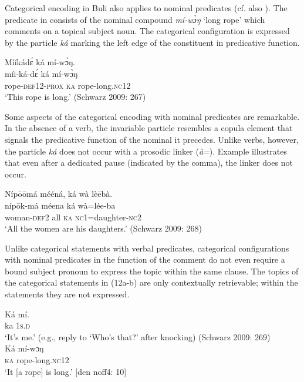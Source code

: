 \documentclass[output=paper]{langsci/langscibook}
\begin{document}
Categorical encoding in Buli also applies to nominal predicates (cf. also \citealt{Schwarz2009tonal}). The predicate in  consists of the nominal compound \textit{mí-w\`ɔŋ} ‘long rope’ which comments on a topical subject noun. The categorical configuration is expressed by the particle \textit{ká} marking the left edge of the constituent in predicative function. 

\ea\label{ex:schwarz:10}
\glll  Mííkád\'ɛ    ká  mí-w\`{ɔ}ŋ.\\
  míi-ká-d\'ɛ    ká  mí-w\`{ɔ}ŋ\\
       rope-\textsc{def}12-\textsc{prox}  \textsc{ka}  rope-long.\textsc{nc}12\\
\glt ‘This rope is long.’ (Schwarz 2009: 267)
\z

Some aspects of the categorical encoding with nominal predicates are remarkable. In the absence of a verb, the invariable particle resembles a copula element that signals the predicative function of the nominal it precedes. Unlike verbs, however, the particle \textit{ká} does not occur with a prosodic linker (\textit{à=}). Example  illustrates that even after a dedicated pause (indicated by the comma), the linker does not occur.

\ea\label{ex:schwarz:11}
\glll   \textup{Níp}\={o}\={o}má  mééná,    ká  {wà  lè\={e}bà.}\\
    níp\={o}k-má  méena    ká  wà=lée-ba\\
   woman-\textsc{def}2  all    \textsc{ka}  \textsc{nc}1=daughter-\textsc{nc}2\\
\glt ‘All the women are his daughters.’ (Schwarz 2009: 268)
\z

Unlike categorical statements with verbal predicates, categorical configurations with nominal predicates in the function of the comment do not even require a bound subject pronoun to express the topic within the same clause. The topics of the categorical statements in (12a-b) are only contextually retrievable; within the statements they are not expressed.     


\begin{exe}
	\ex\label{ex:schwarz:12a}\begin{xlist}
		\ex  \gll Ká  mí. \\
			ka  1\textsc{s.d}\\
\glt   ‘It’s me.’ (e.g., reply to ‘Who’s that?’ after knocking) (Schwarz 2009: 269)
{ } \\
		\ex\gll  Ká  mí-wɔŋ\\
			\textsc{ka}  rope-long.\textsc{nc}12\\
    \glt ‘It [a rope] is long.’ [den noff4: 10]
	\end{xlist}
\end{exe}
\end{document}
